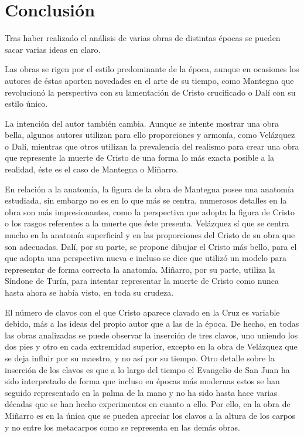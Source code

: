 \section{Conclusión}
Tras haber realizado el análisis de varias obras de distintas épocas se pueden sacar varias ideas en claro.

Las obras se rigen por el estilo predominante de la época, aunque en ocasiones los autores de éstas aporten novedades en el arte de su tiempo, como Mantegna que revolucionó la perspectiva con su lamentación de Cristo crucificado o Dalí con su estilo único.

La intención del autor también cambia. Aunque se intente mostrar una obra bella, algunos autores utilizan para ello proporciones y armonía, como Velázquez o Dalí, mientras que otros utilizan la prevalencia del realismo para crear una obra que represente la muerte de Cristo de una forma lo más exacta posible a la realidad, éste es el caso de Mantegna o Miñarro.

En relación a la anatomía, %
la figura de la obra de Mantegna posee una anatomía estudiada, sin embargo no es en lo que más se centra, numerosos detalles en la obra son más impresionantes, como la perspectiva que adopta la figura de Cristo o los rasgos referentes a la muerte que éste presenta. Velázquez sí que se centra mucho en la anatomía superficial y en las proporciones del Cristo de su obra que son adecuadas. Dalí, por su parte, se propone dibujar el Cristo más bello, para el que adopta una perspectiva nueva e incluso se dice que utilizó un modelo para representar de forma correcta la anatomía. Miñarro, por su parte, utiliza la Síndone de Turín, para intentar representar la muerte de Cristo como nunca hasta ahora se había visto, en toda su crudeza.

El número de clavos con el que Cristo aparece clavado en la Cruz es variable debido, más a las ideas del propio autor que a las de la época. De hecho, en todas las obras analizadas se puede observar la inserción de tres clavos, uno uniendo los dos pies y otro en cada extremidad superior, excepto en la obra de Velázquez que se deja influir por su maestro, y no así por su tiempo. Otro detalle sobre la inserción de los clavos es que a lo largo del tiempo el Evangelio de San Juan ha sido interpretado de forma que incluso en épocas más modernas estos se han seguido representado en la palma de la mano y no ha sido hasta hace varias décadas que se han hecho experimentos en cuanto a ello. Por ello, en la obra de Miñarro es en la única que se pueden apreciar los clavos a la altura de los carpos y no entre los metacarpos como se representa en las demás obras.

